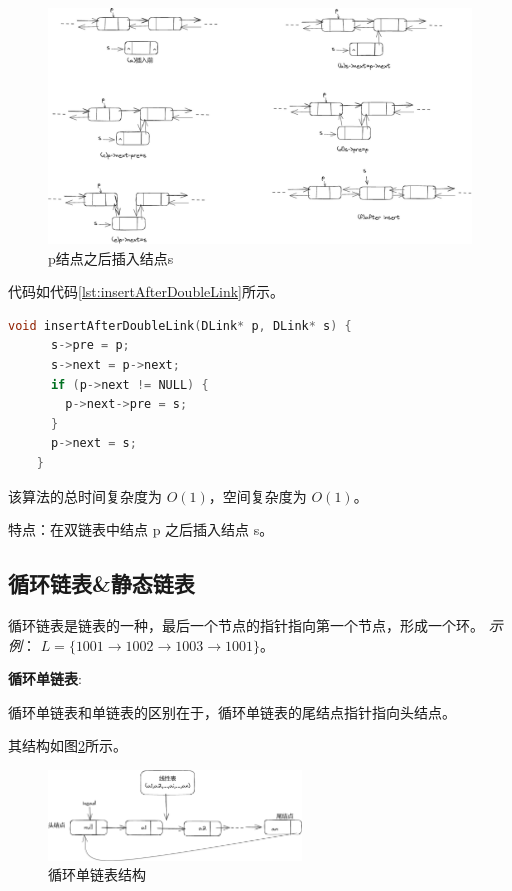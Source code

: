 \documentclass[lang=cn,newtx,10pt,scheme=chinese]{../elegantbook}
\begin{document}
  \begin{figure}[h]
    \centering
    \includegraphics[width=1\textwidth]{./figure/pdf/cropped/insertDL.pdf}
    \caption{p结点之后插入结点s}
    \label{fig:insertAfterDoubleLink}
  \end{figure}
  代码如代码\ref{lst:insertAfterDoubleLink}所示。

  \begin{lstlisting}[language=C++, caption={p结点之后插入结点s示例代码}, label={lst:insertAfterDoubleLink}]
    void insertAfterDoubleLink(DLink* p, DLink* s) {
      s->pre = p;
      s->next = p->next;
      if (p->next != NULL) {
        p->next->pre = s;
      }
      p->next = s;
    }
  \end{lstlisting}

  该算法的总时间复杂度为 $O(1)$，空间复杂度为 $O(1)$。

  特点：在双链表中结点 p 之后插入结点 s。



  \subsection{循环链表\&静态链表}
  循环链表是链表的一种，最后一个节点的指针指向第一个节点，形成一个环。
  \textit{示例}：
  $L = \{1001 \rightarrow 1002 \rightarrow 1003 \rightarrow 1001\}$。

  \textbf{循环单链表}:

  循环单链表和单链表的区别在于，循环单链表的尾结点指针指向头结点。

  其结构如图\ref{fig:cycleSingleLink}所示。

  \begin{figure}[h]
    \centering
    \includegraphics[width=0.6\textwidth]{./figure/pdf/cropped/cycleSLink.pdf}
    \caption{循环单链表结构}
    \label{fig:cycleSingleLink}
  \end{figure}
\end{document}
